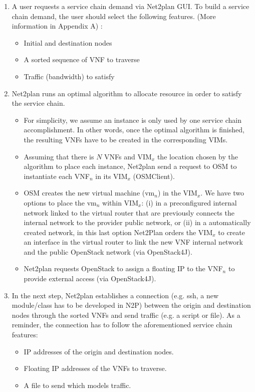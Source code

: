 \documentclass[]{scrartcl}
\begin{document}
	\begin{enumerate}
		\item A user requests a service chain demand via Net2plan GUI. To build a service chain demand, the user should select the following features. (More information in Appendix A) :
		\begin{itemize}
			\item Initial and destination nodes
			\item A sorted sequence of VNF to traverse
			\item Traffic (bandwidth) to satisfy
		\end{itemize} 
		\item Net2plan runs an optimal algorithm to allocate resource in order to satisfy the service chain.
		\begin{itemize}
			\item For simplicity, we assume an instance is only used by one service chain accomplishment. In other words, once the optimal algorithm is finished, the resulting VNFs have to be created in the corresponding VIMs.
			\item Assuming that there is $N$ VNFs and VIM$_x$ the location chosen by the algorithm to place each instance, Net2plan send a request to OSM to instantiate each VNF$_n$ in its VIM$_x$ (OSMClient).
			\item OSM creates the new virtual machine (vm$_n$) in the VIM$_x$. We have two options to place the vm$_n$ within VIM$_x$: (i) in a preconfigured internal network linked to the virtual router that are previously connects the internal network to the provider public network, or (ii) in a automatically created network, in this last option Net2Plan orders the VIM$_x$ to create an interface in the virtual router to link the new VNF internal network and the public OpenStack network (via OpenStack4J).
			\item Net2plan requests OpenStack to assign a floating IP to the VNF$_n$ to provide external access (via OpenStack4J).
		\end{itemize} 
	
		\item In the next step, Net2plan establishes a connection (e.g. ssh, a new module/class has to be developed in N2P) between the origin and destination nodes through the sorted VNFs and send traffic (e.g. a script or file). As a reminder, the connection has to follow the aforementioned service chain features: 
		\begin{itemize}
			\item IP addresses of the origin and destination nodes.
			\item Floating IP addresses of the VNFs to traverse.
			\item A file to send which models traffic.
		\end{itemize} 
	

\end{enumerate}
\end{document}
